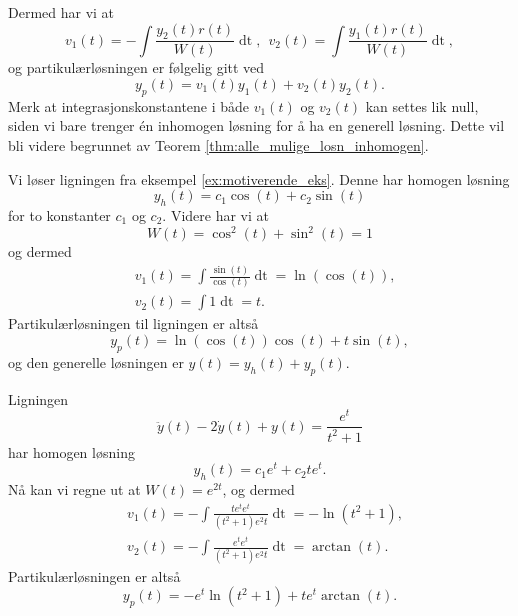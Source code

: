 \documentclass{article}
\theoremstyle{definition}
\newenvironment{ex}
{\pushQED{\qed}\renewcommand{\qedsymbol}{$\triangle$}\exx}
{\popQED\endexx}
\theoremstyle{remark}
\begin{document}
\begin{multicols*}{2}
\begin{equation*}
\end{equation*}
Dermed har vi at
\begin{equation*}
  v_1(t) = -\int \frac{y_2(t) r(t)}{W(t)} \mathop{dt}, \ \ v_2(t) = \int \frac{y_1(t) r(t)}{W(t)} \mathop{dt},
\end{equation*}
og partikulærløsningen er følgelig gitt ved
\begin{equation*}
  y_p(t) = v_1(t) y_1(t) + v_2(t) y_2(t).
\end{equation*}
Merk at integrasjonskonstantene i både $v_1(t)$ og $v_2(t)$ kan settes lik null, siden vi bare trenger én inhomogen løsning for å ha en generell løsning. Dette vil bli videre begrunnet av Teorem \ref{thm:alle_mulige_losn_inhomogen}.

\begin{ex}
  Vi løser ligningen fra eksempel \ref{ex:motiverende_eks}. Denne har homogen løsning
  \begin{equation*}
    y_h(t) = c_1 \cos(t) + c_2 \sin(t)
  \end{equation*}
  for to konstanter $c_1$ og $c_2$. Videre har vi at
  \begin{equation*}
    W(t) = \cos^2(t) + \sin^2(t) = 1
  \end{equation*}
  og dermed
  \begin{equation*}
    \begin{split}
      & v_1(t) = \int \frac{\sin(t)}{\cos(t)} \mathop{dt} = \ln(\cos(t)), \\
      & v_2(t) = \int 1 \mathop{dt} = t.
    \end{split}
  \end{equation*}
  Partikulærløsningen til ligningen er altså
  \begin{equation*}
    y_p(t) = \ln(\cos(t)) \cos(t) + t \sin(t),
  \end{equation*}
  og den generelle løsningen er $y(t) = y_h(t) + y_p(t)$.
\end{ex}

\begin{ex}
  Ligningen
  \begin{equation*}
    \ddot{y}(t) - 2\dot{y}(t) + y(t) = \frac{e^t}{t^2 + 1}
  \end{equation*}
  har homogen løsning
  \begin{equation*}
    y_h(t) = c_1 e^t + c_2 t e^{t}.
  \end{equation*}
  Nå kan vi regne ut at $W(t) = e^{2t}$, og dermed
  \begin{equation*}
    \begin{split}
      & v_1(t) = - \int \frac{t e^t e^t}{(t^2 + 1) e^2t} \mathop{dt} = - \ln(t^2 + 1), \\
      & v_2(t) = - \int \frac{e^t e^t}{(t^2 + 1) e^2t} \mathop{dt} = \arctan(t).
    \end{split}
  \end{equation*}
  Partikulærløsningen er altså
  \begin{equation*}
    y_p(t) = - e^t \ln(t^2 + 1) + t e^t \arctan(t).
  \end{equation*}
\end{ex}


\end{multicols*}
\end{document}
